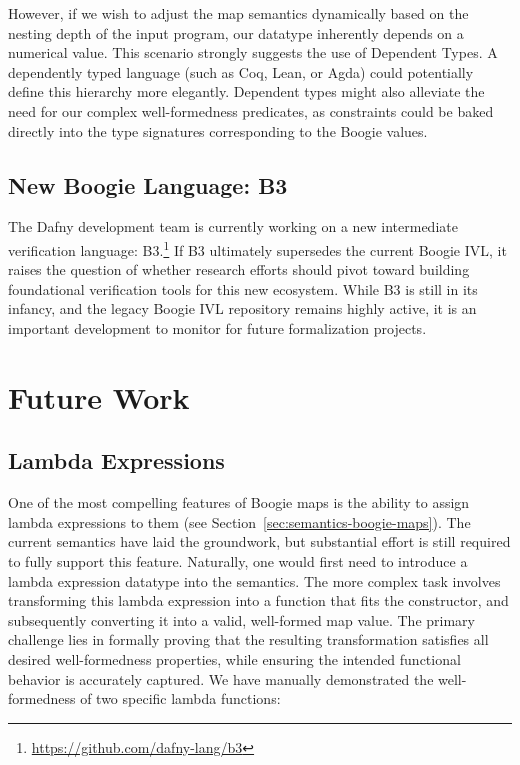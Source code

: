 However, if we wish to adjust the map semantics dynamically based on the nesting depth of the input program,
our datatype inherently depends on a numerical value.
This scenario strongly suggests the use of Dependent Types. %
A dependently typed language (such as Coq, Lean, or Agda) could potentially define this hierarchy more elegantly.
Dependent types might also alleviate the need for our complex well-formedness predicates,
as constraints could be baked directly into the type signatures corresponding to the Boogie values.



\subsection{New Boogie Language: B3}

The Dafny development team is currently working on a new intermediate verification language: B3.\footnote{\url{https://github.com/dafny-lang/b3}}
If B3 ultimately supersedes the current Boogie IVL,
it raises the question of whether research efforts should pivot toward building foundational verification tools for this new ecosystem.
While B3 is still in its infancy, and the legacy Boogie IVL repository remains highly active,
it is an important development to monitor for future formalization projects.


\section{Future Work}

\subsection{Lambda Expressions}

One of the most compelling features of Boogie maps is the ability to assign lambda expressions to them (see Section~\ref{sec:semantics-boogie-maps}).
The current semantics have laid the groundwork, but substantial effort is still required to fully support this feature.
Naturally, one would first need to introduce a lambda expression datatype into the semantics.
The more complex task involves transforming this lambda expression into a function that fits the  constructor,
and subsequently converting it into a valid, well-formed map value.
The primary challenge lies in formally proving that the resulting transformation satisfies all desired well-formedness properties,
while ensuring the intended functional behavior is accurately captured.
We have manually demonstrated the well-formedness of two specific lambda functions:

